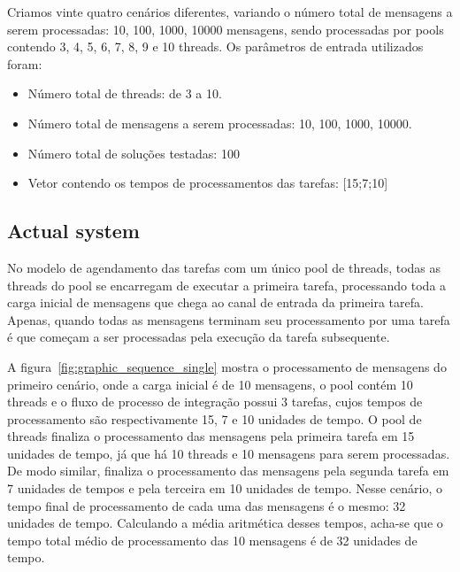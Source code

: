 Criamos vinte quatro cenários diferentes, variando o número total de mensagens a serem processadas: 10, 100, 1000, 10000 mensagens, sendo processadas por pools contendo 3, 4, 5, 6, 7, 8, 9 e 10 threads.
Os parâmetros de entrada utilizados foram:
\begin{itemize}
\item Número total de threads: de 3 a 10.
\item Número total de mensagens a serem processadas: 10, 100, 1000, 10000.
\item Número total de soluções testadas: 100
\item Vetor contendo os tempos de processamentos das tarefas: [15;7;10] 
\end{itemize}
\subsection{Actual system}
\label{subsec:actual_system}
No modelo de agendamento das tarefas com um único pool de threads, todas as threads do pool se encarregam de executar a primeira tarefa, processando toda a carga inicial de mensagens que chega ao canal de entrada da primeira tarefa. Apenas, quando todas as mensagens terminam seu processamento por uma tarefa é que começam a ser processadas pela execução da tarefa subsequente. 

A figura~\ref{fig:graphic_sequence_single} mostra o processamento de mensagens do primeiro cenário, onde a carga inicial é de 10 mensagens, o pool contém 10 threads e o fluxo de processo de integração possui 3 tarefas, cujos tempos de processamento são respectivamente 15, 7 e 10 unidades de tempo. O pool de threads finaliza o processamento das mensagens pela primeira tarefa em 15 unidades de tempo, já que há 10 threads e 10 mensagens para serem processadas. De modo similar, finaliza o processamento das mensagens pela segunda tarefa em 7 unidades de tempos e pela terceira em 10 unidades de tempo. Nesse cenário, o tempo final de processamento de cada uma das mensagens é o mesmo: 32 unidades de tempo. Calculando a média aritmética desses tempos, acha-se que o tempo total médio de processamento das 10 mensagens é de 32 unidades de tempo.

